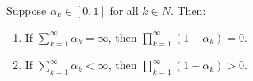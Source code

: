 Suppose $\alpha_k \in [0,1]$ for all $k \in N$. Then:
\begin{enumerate}
\item[(i)] If $\sum_{k=1}^\infty \alpha_k = \infty$, then $\prod_{k=1}^\infty (1-\alpha_k) = 0$.
\item[(ii)] If $\sum_{k=1}^\infty \alpha_k < \infty$, then $\prod_{k=1}^\infty (1-\alpha_k) > 0$.
\end{enumerate}
